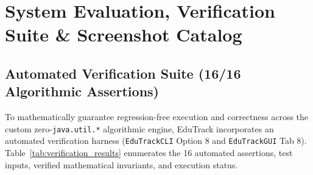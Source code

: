 \chapter{System Evaluation, Verification Suite \& Screenshot Catalog}
\label{ch:evaluation_screenshots}

\section{Automated Verification Suite (16/16 Algorithmic Assertions)}
To mathematically guarantee regression-free execution and correctness across the custom zero-\texttt{java.util.*} algorithmic engine, EduTrack incorporates an automated verification harness (\texttt{EduTrackCLI} Option 8 and \texttt{EduTrackGUI} Tab 8). Table~\ref{tab:verification_results} enumerates the 16 automated assertions, test inputs, verified mathematical invariants, and execution status.

